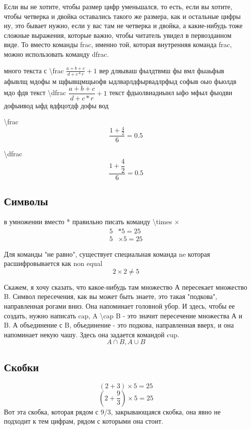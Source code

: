 \documentclass[a4paper,12pt]{article} %
\begin{document}
 Если вы не хотите, чтобы размер
 цифр уменьшался, то есть, если вы хотите, чтобы четверка и двойка оставались
 такого же размера, как и остальные цифры ну, это бывает нужно, если у вас
 там не четверка и двойка, а какие-нибудь тоже сложные выражения, которые важно,
 чтобы читатель увидел в первозданном виде. То вместо команды frac, именно той,
 которая внутренняя команда frac, можно
 использовать команду dfrac.
 
 много текста с \textbackslash frac $\frac{a+b+c}{d+c*r}+1$ вер дляываш фылдтвмш фы вмл фыаьфыв афывлщ мдофы м щфывщмщыофв
 ыдлварлдфырвадлрфыд софыв оыо фыолдв мдо фдв
 текст \textbackslash dfrac $\dfrac{a+b+c}{d+c*r}+1$ текст фдыолвиадиыил ыфо мфыл 
 фыодви дофыивод ыфд вдфцотдф дофы вод 
 
 \textbackslash frac
 \[\frac{1+\frac{4}{2}}{6}=0.5\]
 
 \textbackslash dfrac
 \[\frac{1+\dfrac{4}{2}}{6}=0.5\]
\subsection{Символы}

в умножении вместо * правильно писать команду \textbackslash times $\times$
\begin{equation}
	\begin{aligned}
		 5 &* 5=25 \\
		 5 &\times 5=25
	\end{aligned}
\end{equation}

 Для команды "не равно", существует
 специальная команда ne которая расшифровывается как non equal
\[2\times2\ne5\]

Скажем, я хочу сказать, что какое-нибудь там множество А пересекает
множество B. Символ пересечения, как вы может быть знаете, это такая "подкова", направленная
рогами вниз. Она напоминает головной убор. И здесь, чтобы ее создать, нужно написать
cap, A  \textbackslash cap B - это значит пересечение множества А
и B.  А объединение с B, объединение - это подкова, направленная вверх, и она
напоминает некую чашу. Здесь она задается командой cup.
\[ A \cap B, A \cup B \]

\subsection{Скобки}
\[(2+3)\times5=25\]
\[(2+\frac{9}{3})\times5=25\]
Вот эта скобка, которая рядом с 9/3,
закрывающаяся скобка, она явно не подходит к тем цифрам, рядом с
которыми она стоит.
\end{document}
